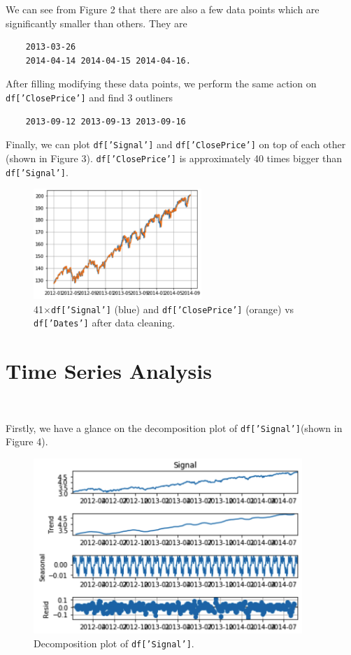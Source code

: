 \documentclass[11pt, oneside]{article}   	%
\begin{document}
We can see from Figure 2 that there are also a few data points which are significantly smaller than others. They are
\begin{lstlisting}
	2013-03-26
	2014-04-14 2014-04-15 2014-04-16.
\end{lstlisting}
After filling modifying these data points, we perform the same action on \texttt{df['ClosePrice']} and find 3 outliners
\begin{lstlisting}
	2013-09-12 2013-09-13 2013-09-16
\end{lstlisting}

Finally, we can plot \texttt{df['Signal']} and \texttt{df['ClosePrice']}  on top of each other (shown in Figure 3). \texttt{df['ClosePrice']} is approximately 40 times bigger than \texttt{df['Signal']}.
\begin{figure}[htbp]
   \centering
   \includegraphics[width = 2.5in]{sc.png} 
       \caption{41$\times$\texttt{df['Signal']} (blue) and \texttt{df['ClosePrice']} (orange) vs \texttt{df['Dates']} after data cleaning.}
\end{figure}




\section{Time Series Analysis}

\

Firstly, we have a glance on the decomposition plot of \texttt{df['Signal']}(shown in Figure 4).
\begin{figure}[htbp]
   \centering
   \includegraphics[width = 4in]{decom.png} 
       \caption{Decomposition plot of \texttt{df['Signal']}.}
\end{figure}
\end{document}
